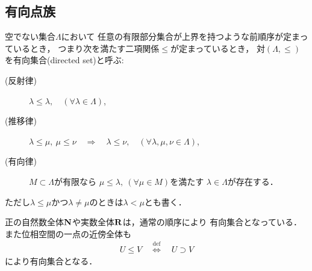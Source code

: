 \subsection{有向点族}
	\begin{screen}
		\begin{dfn}[有向集合]
			空でない集合$\Lambda$において
			任意の有限部分集合が上界を持つような前順序が定まっているとき，
			つまり次を満たす二項関係$\leq$が定まっているとき，
			対$(\Lambda,\leq)$を有向集合(directed set)と呼ぶ:
			\begin{description}
				\item[(反射律)] $\lambda \leq \lambda,\quad (\forall \lambda \in \Lambda)$,
				\item[(推移律)] $\lambda \leq \mu,\ \mu \leq \nu 
					\quad \Longrightarrow \quad \lambda \leq \nu,\quad 
					(\forall \lambda,\mu,\nu \in \Lambda)$,
				\item[(有向律)] 
					$M \subset \Lambda$が有限なら
					$\mu \leq \lambda,\ (\forall \mu \in M)$を満たす
					$\lambda \in \Lambda$が存在する．
			\end{description}
			ただし$\lambda \leq \mu$かつ$\lambda \neq \mu$のときは$\lambda < \mu$とも書く．
		\end{dfn}
	\end{screen}
	正の自然数全体$\mathbf{N}$や実数全体$\mathbf{R}$は，通常の順序により
	有向集合となっている．また位相空間の一点の近傍全体も
	\begin{align}
		U \leq V \quad \overset{\mathrm{def}}{\Longleftrightarrow} \quad
		U \supset V
	\end{align}
	により有向集合となる．
	
